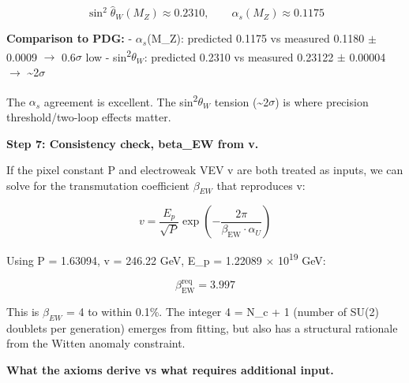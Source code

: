 \documentclass[11pt,a4paper]{article}
\theoremstyle{remark}
\begin{document}
\[
\sin^2\hat{\theta}_W(M_Z) \approx 0.2310, \qquad \alpha_s(M_Z) \approx 0.1175
\]

\textbf{Comparison to PDG:}
- $\alpha_s$(M\_Z): predicted 0.1175 vs measured 0.1180 \ensuremath{\pm} 0.0009 \ensuremath{\to} 0.6\ensuremath{\sigma} low
- sin\textsuperscript{2}$\theta_W$: predicted 0.2310 vs measured 0.23122 \ensuremath{\pm} 0.00004 \ensuremath{\to} \textasciitilde2\ensuremath{\sigma}

The $\alpha_s$ agreement is excellent. The sin\textsuperscript{2}$\theta_W$ tension (\textasciitilde2\ensuremath{\sigma}) is where precision threshold/two-loop effects matter.

\textbf{Step 7: Consistency check, beta\_EW from v.}

If the pixel constant P and electroweak VEV v are both treated as inputs, we can solve for the transmutation coefficient $\beta_{EW}$ that reproduces v:

\[
v = \frac{E_p}{\sqrt{P}} \exp\left(-\frac{2\pi}{\beta_\mathrm{EW} \cdot \alpha_U}\right)
\]

Using P = 1.63094, v = 246.22 GeV, E\_p = 1.22089 \ensuremath{\times} 10\textsuperscript{19} GeV:

\[
\beta_\mathrm{EW}^\mathrm{req} = 3.997
\]

This is $\beta_{EW}$ = 4 to within 0.1\%. The integer 4 = N\_c + 1 (number of SU(2) doublets per generation) emerges from fitting, but also has a structural rationale from the Witten anomaly constraint.

\textbf{What the axioms derive vs what requires additional input.}
\end{document}
